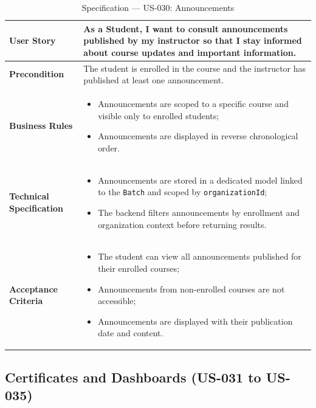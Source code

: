 \begin{table}[H]
\centering
\caption{Specification — US-030: Announcements}
\label{tab:us030}
\renewcommand{\arraystretch}{1.2}
\begin{tabularx}{\textwidth}{|p{3.5cm}|X|}
\hline
\textbf{User Story} & As a Student, I want to consult announcements published by my instructor so that I stay informed about course updates and important information. \\
\hline
\textbf{Precondition} & The student is enrolled in the course and the instructor has published at least one announcement. \\
\hline
\textbf{Business Rules} &
\begin{itemize}[noitemsep, topsep=2pt]
  \item Announcements are scoped to a specific course and visible only to enrolled students;
  \item Announcements are displayed in reverse chronological order.
\end{itemize} \\
\hline
\textbf{Technical Specification} &
\begin{itemize}[noitemsep, topsep=2pt]
  \item Announcements are stored in a dedicated model linked to the \texttt{Batch} and scoped by \texttt{organizationId};
  \item The backend filters announcements by enrollment and organization context before returning results.
\end{itemize} \\
\hline
\textbf{Acceptance Criteria} &
\begin{itemize}[noitemsep, topsep=2pt]
  \item The student can view all announcements published for their enrolled courses;
  \item Announcements from non-enrolled courses are not accessible;
  \item Announcements are displayed with their publication date and content.
\end{itemize} \\
\hline
\end{tabularx}
\end{table}

\subsection{Certificates and Dashboards (US-031 to US-035)}

